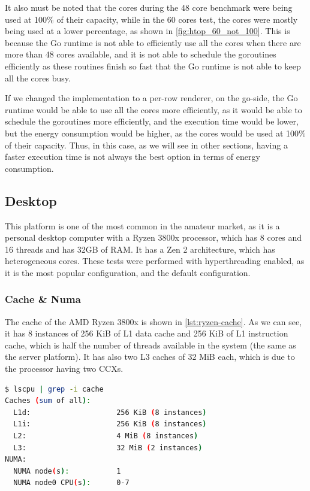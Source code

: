 It also must be noted that the cores during the 48 core benchmark were being used at 100\% of their capacity, while in the 60 cores test, the cores were mostly being used at a lower percentage, as shown in \autoref{fig:htop_60_not_100}. This is because the Go runtime is not able to efficiently use all the cores when there are more than 48 cores available, and it is not able to schedule the goroutines efficiently as these routines finish so fast that the Go runtime is not able to keep all the cores busy.

If we changed the implementation to a per-row renderer, on the go-side, the Go runtime would be able to use all the cores more efficiently, as it would be able to schedule the goroutines more efficiently, and the execution time would be lower, but the energy consumption would be higher, as the cores would be used at 100\% of their capacity. Thus, in this case, as we will see in other sections, having a faster execution time is not always the best option in terms of energy consumption.





\subsection{Desktop}
This platform is one of the most common in the amateur market, as it is a personal desktop computer with a Ryzen 3800x processor, which has 8 cores and 16 threads and has 32GB of RAM. It has a Zen 2 architecture, which has heterogeneous cores. These tests were performed with hyperthreading enabled, as it is the most popular configuration, and the default configuration. 

\subsubsection{Cache \& Numa}
The cache of the AMD Ryzen 3800x is shown in \autoref{lst:ryzen-cache}. As we can see, it has 8 instances of 256 KiB of L1 data cache and 256 KiB of L1 instruction cache, which is half the number of threads available in the system (the same as the server platform). It has also two L3 caches of 32 MiB each, which is due to the processor having two \glspl{CCX}. 

\begin{lstlisting}[language=bash, caption={Cache of the AMD Ryzen 3800x}, label={lst:ryzen-cache}]
$ lscpu | grep -i cache
Caches (sum of all):
  L1d:                    256 KiB (8 instances)
  L1i:                    256 KiB (8 instances)
  L2:                     4 MiB (8 instances)
  L3:                     32 MiB (2 instances)
NUMA:
  NUMA node(s):           1
  NUMA node0 CPU(s):      0-7
\end{lstlisting}


